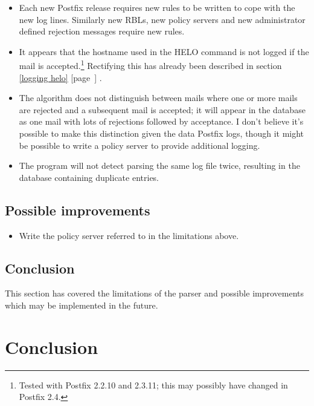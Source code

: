 \documentclass[a4paper,12pt,draft]{article}
\newcommand{\refwithpage}[1]{%
    \empty{}\ref{#1} [page~\pageref{#1}]%
}
\begin{document}
\begin{itemize}

    \item Each new Postfix release requires new rules to be written to cope
        with the new log lines.  Similarly new RBLs, new policy servers and
        new administrator defined rejection messages require new rules.

    \item It appears that the hostname used in the HELO command is not
        logged if the mail is accepted.\footnote{Tested with Postfix 2.2.10
        and 2.3.11; this may possibly have changed in Postfix 2.4.}
        Rectifying this has already been described in
        section~\refwithpage{logging helo}.

    \item The algorithm does not distinguish between mails where one or
        more mails are rejected and a subsequent mail is accepted; it will
        appear in the database as one mail with lots of rejections followed
        by acceptance.  I don't believe it's possible to make this
        distinction given the data Postfix logs, though it might be
        possible to write a policy server to provide additional logging.

    \item The program will not detect parsing the same log file twice,
        resulting in the database containing duplicate entries.

\end{itemize}

\subsection{Possible improvements}

\begin{itemize}

    \item Write the policy server referred to in the limitations above.

\end{itemize}

\subsection{Conclusion}

This section has covered the limitations of the parser and possible
improvements which may be implemented in the future.

\section{Conclusion}
\end{document}
